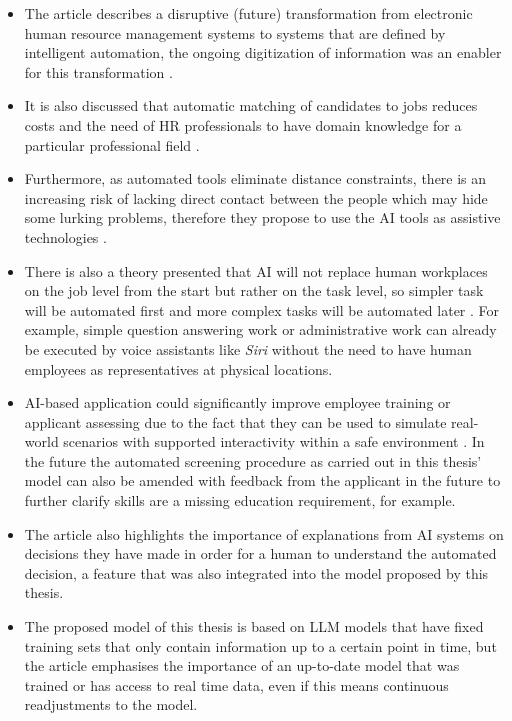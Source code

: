 \documentclass[draft,final]{thesisclass} %
\begin{document}
\begin{itemize}
    \item The article describes a disruptive (future) transformation from electronic human resource management systems to systems that are defined by intelligent automation, the ongoing digitization of information was an enabler for this transformation \cite[4]{ai_hrm_review}.
    \item It is also discussed that automatic matching of candidates to jobs reduces costs and the need of \acs{HR} professionals to have domain knowledge for a particular professional field \cite[10]{ai_hrm_review}.
    \item Furthermore, as automated tools eliminate distance constraints, there is an increasing risk of lacking direct contact between the people which may hide some lurking problems, therefore they propose to use the \acs{AI} tools as assistive technologies \cite[12]{ai_hrm_review}.
    \item There is also a theory presented that \acs{AI} will not replace human workplaces on the job level from the start but rather on the task level, so simpler task will be automated first and more complex tasks will be automated later \cite[12]{ai_hrm_review}. For example, simple question answering work or administrative work can already be executed by voice assistants like \textit{Siri} without the need to have human employees as representatives at physical locations.
    \item \acs{AI}-based application could significantly improve employee training or applicant assessing due to the fact that they can be used to simulate real-world scenarios with supported interactivity within a safe environment \cite[13]{ai_hrm_review}. In the future the automated screening procedure as carried out in this thesis' model can also be amended with feedback from the applicant in the future to further clarify skills are a missing education requirement, for example.
    \item The article \parencite[14]{ai_hrm_review} also highlights the importance of explanations from \acs{AI} systems on decisions they have made in order for a human to understand the automated decision, a feature that was also integrated into the model proposed by this thesis.
    \item The proposed model of this thesis is based on \acs{LLM} models that have fixed training sets that only contain information up to a certain point in time, but the article \textcite[13]{ai_hrm_review} emphasises the importance of an up-to-date model that was trained or has access to real time data, even if this means continuous readjustments to the model.
\end{itemize}
\end{document}
